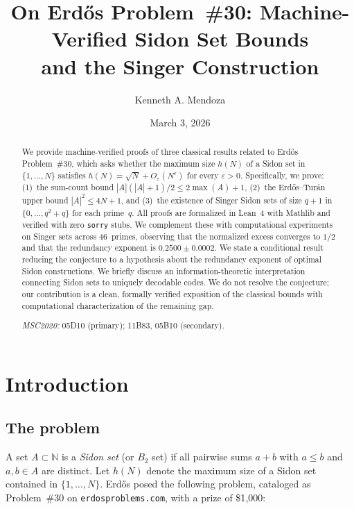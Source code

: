 \documentclass[11pt]{amsart}
\title{On Erd\H{o}s Problem~\#30: Machine-Verified Sidon Set Bounds\\
  and the Singer Construction}
\author{Kenneth A. Mendoza}
\date{March 3, 2026}
\theoremstyle{plain}
\theoremstyle{definition}
\theoremstyle{remark}
\begin{document}
\maketitle

\begin{abstract}
We provide machine-verified proofs of three classical results related to
Erd\H{o}s Problem~\#30, which asks whether the maximum size $h(N)$
of a Sidon set in $\{1,\dots,N\}$ satisfies
$h(N) = \sqrt{N} + O_\varepsilon(N^\varepsilon)$ for every
$\varepsilon > 0$.
Specifically, we prove:
(1)~the sum-count bound $|A|(|A|+1)/2 \le 2\max(A)+1$,
(2)~the Erd\H{o}s--Tur\'an upper bound $|A|^2 \le 4N+1$,
and (3)~the existence of Singer Sidon sets of size $q+1$ in
$\{0,\dots,q^2+q\}$ for each prime~$q$.
All proofs are formalized in Lean~4 with Mathlib and verified with
zero \texttt{sorry} stubs.
We complement these with computational experiments on Singer sets
across 46~primes, observing that the normalized excess converges to
$1/2$ and that the redundancy exponent is $0.2500 \pm 0.0002$.
We state a conditional result reducing the conjecture to a hypothesis
about the redundancy exponent of optimal Sidon constructions.
We briefly discuss an information-theoretic interpretation connecting
Sidon sets to uniquely decodable codes.
We do not resolve the conjecture; our contribution is a clean,
formally verified exposition of the classical bounds with computational
characterization of the remaining gap.

\medskip\noindent
\textit{MSC2020:} 05D10 (primary); 11B83, 05B10 (secondary).
\end{abstract}

\section{Introduction}\label{sec:intro}

\subsection{The problem}

A set $A \subset \mathbb{N}$ is a \emph{Sidon set} (or $B_2$ set) if all
pairwise sums $a + b$ with $a \le b$ and $a, b \in A$ are distinct.
Let $h(N)$ denote the maximum size of a Sidon set contained in
$\{1,\dots,N\}$.
Erd\H{o}s posed the following problem, cataloged as
Problem~\#30 on \texttt{erdosproblems.com}, with a prize of \$1{,}000:
\end{document}
